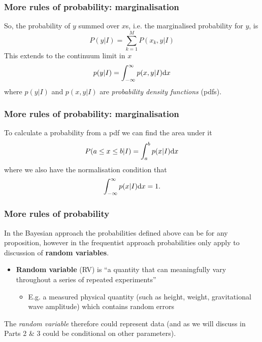 \begin{frame}

\frametitle{More rules of probability: marginalisation}
\label{morerulesofprobability:marginalisation}

So, the probability of $y$ summed over $x$s, i.e. the marginalised probability for $y$, is
\[
P(y|I) = \sum_{k=1}^M  P(x_k,y|I) 
\]
This extends to the continuum limit in $x$
\[
p(y|I) = \int_{-\infty}^{\infty} p(x,y|I) {\rm d}x
\]
where $p(y|I)$ and $p(x,y|I)$ are \emph{probability density functions} (pdfs).

\end{frame}

\begin{frame}

\frametitle{More rules of probability: marginalisation}
\label{morerulesofprobability:marginalisation}

To calculate a probability from a pdf we can find the area under it
\[
P(a\le x \le b|I) = \int_a^b p(x|I) {\rm d}x
\]
where we also have the normalisation condition that
\[
\int_{-\infty}^{\infty} p(x|I) {\rm d}x = 1.
\]

\end{frame}

\begin{frame}

\frametitle{More rules of probability}
\label{morerulesofprobability}

In the Bayesian approach the probabilities defined above can be for any proposition, however in the
frequentist approach probabilities only apply to discussion of \textbf{random variables}.

\begin{itemize}
\item \textbf{Random variable} (RV) is ``a quantity that can meaningfully vary throughout a series of repeated
experiments''

\begin{itemize}
\item E.g. a measured physical quantity (such as height, weight, gravitational wave amplitude) which contains random errors

\end{itemize}

\end{itemize}

The \emph{random variable} therefore could represent data (and as we will discuss in Parts 2 \& 3 could be
conditional on other parameters).

\end{frame}

